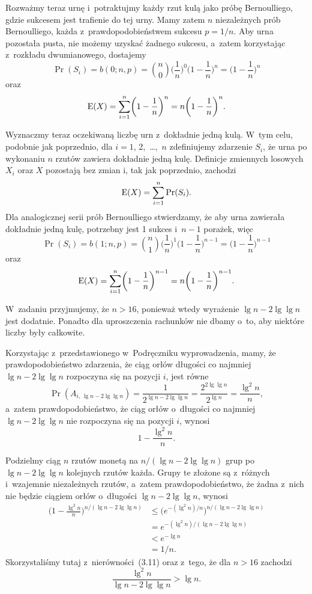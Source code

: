 Rozważmy teraz  urnę i~potraktujmy każdy rzut kulą jako próbę Bernoulliego, gdzie sukcesem jest trafienie do tej urny. Mamy zatem $n$ niezależnych prób Bernoulliego, każda z~prawdopodobieństwem sukcesu $p=1/n$. Aby  urna pozostała pusta, nie możemy uzyskać żadnego sukcesu, a~zatem korzystając z~rozkładu dwumianowego, dostajemy
\[
	\Pr(S_i) = b(0;n,p) = \binom{n}{0}\biggl(\frac{1}{n}\biggr)^0\biggl(1-\frac{1}{n}\biggr)^n = \biggl(1-\frac{1}{n}\biggr)^n
\]
oraz
\[
	\operatorname{E}(X) = \sum_{i=1}^n\biggl(1-\frac{1}{n}\biggr)^n = n\biggl(1-\frac{1}{n}\biggr)^n.
\]

Wyznaczmy teraz oczekiwaną liczbę urn z~dokładnie jedną kulą. W~tym celu, podobnie jak poprzednio, dla $i=1$, 2,~\dots,~$n$ zdefiniujemy zdarzenie $S_i$, że  urna po wykonaniu $n$ rzutów zawiera dokładnie jedną kulę. Definicje zmiennych losowych $X_i$ oraz $X$ pozostają bez zmian i, tak jak poprzednio, zachodzi
\[
	\operatorname{E}(X) = \sum_{i=1}^n\Pr(S_i).
\]
Dla analogicznej serii prób Bernoulliego stwierdzamy, że aby  urna zawierała dokładnie jedną kulę, potrzebny jest 1 sukces i~$n-1$ porażek, więc
\[
	\Pr(S_i) = b(1;n,p) = \binom{n}{1}\biggl(\frac{1}{n}\biggr)^1\biggl(1-\frac{1}{n}\biggr)^{n-1} = \biggl(1-\frac{1}{n}\biggr)^{n-1}
\]
oraz
\[
	\operatorname{E}(X) = \sum_{i=1}^n\biggl(1-\frac{1}{n}\biggr)^{n-1} = n\biggl(1-\frac{1}{n}\biggr)^{n-1}.
\]

\exercise %
W~zadaniu przyjmujemy, że $n>16$, ponieważ wtedy wyrażenie $\lg n-2\lg\lg n$ jest dodatnie. Ponadto dla uproszczenia rachunków nie dbamy o~to, aby niektóre liczby były całkowite.

Korzystając z~przedstawionego w~Podręczniku wyprowadzenia, mamy, że prawdopodobieństwo zdarzenia, że ciąg orłów długości co najmniej $\lg n-2\lg\lg n$ rozpoczyna się na pozycji $i$, jest równe
\[
	\Pr(A_{i,\,\lg n-2\lg\lg n}) = \frac{1}{2^{\lg n-2\lg\lg n}} = \frac{2^{2\lg\lg n}}{2^{\lg n}} = \frac{\lg^2n}{n},
\]
a~zatem prawdopodobieństwo, że ciąg orłów o~długości co najmniej $\lg n-2\lg\lg n$ nie rozpoczyna się na pozycji $i$, wynosi
\[
	1-\frac{\lg^2n}{n}.
\]

Podzielmy ciąg $n$ rzutów monetą na $n/(\lg n-2\lg\lg n)$ grup po $\lg n-2\lg\lg n$ kolejnych rzutów każda. Grupy te złożone są z~różnych i~wzajemnie niezależnych rzutów, a~zatem prawdopodobieństwo, że żadna z~nich nie będzie ciągiem orłów o~długości $\lg n-2\lg\lg n$, wynosi
\begin{align*}
	\biggl(1-\frac{\lg^2n}{n}\biggr)^{n/(\lg n-2\lg\lg n)} &\le \bigl(e^{-(\lg^2n)/n}\bigr)^{n/(\lg n-2\lg\lg n)} \\
	&= e^{-(\lg^2n)/(\lg n-2\lg\lg n)} \\
	&< e^{-\lg n} \\
	&= 1/n.
\end{align*}
Skorzystaliśmy tutaj z~nierówności~(3.11) oraz z~tego, że dla $n>16$ zachodzi
\[
	\frac{\lg^2n}{\lg n-2\lg\lg n} > \lg n.
\]


